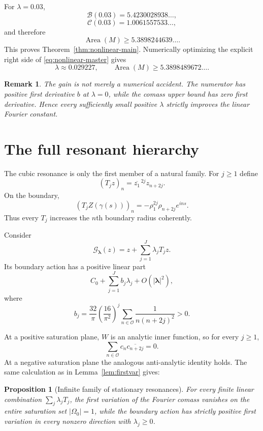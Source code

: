 \documentclass[11pt]{article}
\newtheorem{proposition}[theorem]{Proposition}
\newtheorem{remark}[theorem]{Remark}
\newcommand{\Area}{\operatorname{Area}}
\begin{document}
For $\lambda=0.03$,
\[
 \mathcal B(0.03)
 =5.4230028938\ldots,
\]
\[
 \mathcal C(0.03)
 =1.0061557533\ldots,
\]
and therefore
\[
        \Area(M)
        \ge5.3898244639\ldots.
\]
This proves Theorem~\ref{thm:nonlinear-main}.  Numerically optimizing the
explicit right side of \eqref{eq:nonlinear-master} gives
\[
        \lambda\approx0.029227,
        \qquad
        \Area(M)\ge5.3898489672\ldots.
\]

\begin{remark}
The gain is not merely a numerical accident.  The numerator has positive
first derivative $b$ at $\lambda=0$, while the comass upper bound has zero
first derivative.  Hence every sufficiently small positive $\lambda$
strictly improves the linear Fourier constant.
\end{remark}

\section{The full resonant hierarchy}

The cubic resonance is only the first member of a natural family.  For
$j\ge1$ define
\begin{equation}\label{eq:Tj}
        (T_jz)_n
        =
        \overline{z_1}^{\,2j}z_{n+2j}.
\end{equation}
On the boundary,
\[
        (T_jZ(\gamma(s)))_n
        =
        -\rho_1^{2j}\rho_{n+2j}e^{ins}.
\]
Thus every $T_j$ increases the $n$th boundary radius coherently.

Consider
\[
        \mathcal G_{\boldsymbol\lambda}(z)
        =
        z+\sum_{j=1}^J\lambda_jT_jz.
\]
Its boundary action has a positive linear part
\[
        C_0+\sum_{j=1}^Jb_j\lambda_j+O(|\boldsymbol\lambda|^2),
\]
where
\begin{equation}\label{eq:bj}
 b_j=
 \frac{32}{\pi}
 \left(\frac{16}{\pi^2}\right)^j
 \sum_{n\in\mathcal O}
 \frac1{n(n+2j)^2}>0.
\end{equation}

At a positive saturation plane,
$W$ is an analytic inner function, so for every $j\ge1$,
\begin{equation}\label{eq:all-autocorr}
        \sum_{n\in\mathcal O}
        c_n\overline{c_{n+2j}}=0.
\end{equation}
At a negative saturation plane the analogous anti-analytic identity holds.
The same calculation as in Lemma~\ref{lem:firstvar} gives:

\begin{proposition}[Infinite family of stationary resonances]
\label{prop:hierarchy}
For every finite linear combination
$\sum_j\lambda_jT_j$, the first variation of the Fourier comass vanishes
on the entire saturation set $|\Omega_0|=1$, while the boundary action has
strictly positive first variation in every nonzero direction with
$\lambda_j\ge0$.
\end{proposition}
\end{document}
